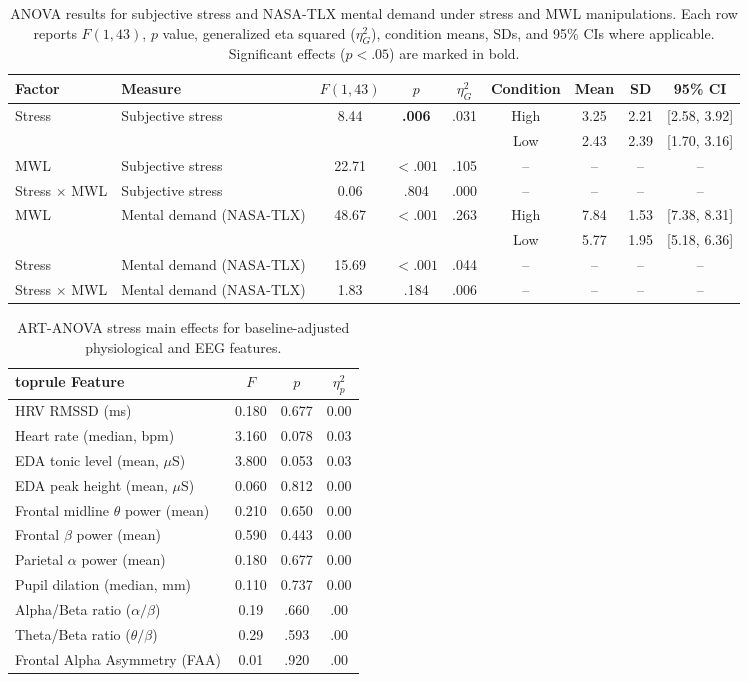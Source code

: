 \documentclass[lettersize,journal]{IEEEtran}
\begin{document}
\begin{table}[!t]
\centering
\caption{ANOVA results for subjective stress and NASA-TLX mental demand under stress and MWL manipulations. Each row reports $F(1,43)$, $p$ value, generalized eta squared ($\eta^2_G$), condition means, SDs, and 95\% CIs where applicable. Significant effects ($p < .05$) are marked in bold.}
\label{tab:anova_results}
\begin{tabular}{llccccccc}
\toprule
Factor & Measure & $F(1,43)$ & $p$ & $\eta^2_G$ & Condition & Mean & SD & 95\% CI \\
\midrule
\multirow{2}{*}{Stress} & \multirow{2}{*}{Subjective stress}
& 8.44 & \textbf{.006} & .031 & High & 3.25 & 2.21 & [2.58, 3.92] \\
& & & & & Low & 2.43 & 2.39 & [1.70, 3.16] \\
MWL & Subjective stress
& 22.71 & \textbf{$<.001$} & .105 & -- & -- & -- & -- \\
Stress $\times$ MWL & Subjective stress
& 0.06 & .804 & .000 & -- & -- & -- & -- \\
\midrule
MWL & \multirow{2}{*}{Mental demand (NASA-TLX)}
& 48.67 & \textbf{$<.001$} & .263 & High & 7.84 & 1.53 & [7.38, 8.31] \\
& & & & & Low & 5.77 & 1.95 & [5.18, 6.36] \\
Stress & Mental demand (NASA-TLX)
& 15.69 & \textbf{$<.001$} & .044 & -- & -- & -- & -- \\
Stress $\times$ MWL & Mental demand (NASA-TLX)
& 1.83 & .184 & .006 & -- & -- & -- & -- \\
\bottomrule
\end{tabular}
\end{table}


\begin{table}[!t]
\centering
\caption{ART-ANOVA stress main effects for baseline-adjusted physiological and EEG features.}
\label{tab:anova_art_stress}
\begin{tabular}{lccc}
            \csname toprule\endcsname
Feature & $F$ & $p$ & $\eta^2_{p}$ \\
\midrule
HRV RMSSD (ms) & 0.180 & 0.677 & 0.00 \\
Heart rate (median, bpm) & 3.160 & 0.078 & 0.03 \\
EDA tonic level (mean, $\mu$S) & 3.800 & 0.053 & 0.03 \\
EDA peak height (mean, $\mu$S) & 0.060 & 0.812 & 0.00 \\
Frontal midline $\theta$ power (mean) & 0.210 & 0.650 & 0.00 \\
Frontal $\beta$ power (mean) & 0.590 & 0.443 & 0.00 \\
Parietal $\alpha$ power (mean) & 0.180 & 0.677 & 0.00 \\
Pupil dilation (median, mm) & 0.110 & 0.737 & 0.00 \\
Alpha/Beta ratio ($\alpha/\beta$) & 0.19 & .660 & .00 \\
Theta/Beta ratio ($\theta/\beta$) & 0.29 & .593 & .00 \\
Frontal Alpha Asymmetry (FAA) & 0.01 & .920 & .00 \\
\bottomrule
\end{tabular}
\end{table}
\end{document}
